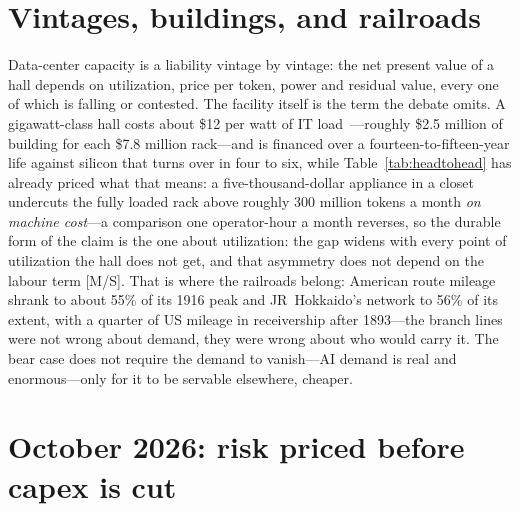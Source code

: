 \section{Vintages, buildings, and railroads}

Data-center capacity is a liability vintage by vintage: the net present value of a hall depends on utilization, price per token, power and residual value, every one of which is falling or contested. The facility itself is the term the debate omits. A gigawatt-class hall costs about \$12 per watt of IT load~\cite{matsuoka-dc-survey}---roughly \$2.5 million of building for each \$7.8 million rack---and is financed over a fourteen-to-fifteen-year life against silicon that turns over in four to six, while Table~\ref{tab:headtohead} has already priced what that means: a five-thousand-dollar appliance in a closet undercuts the fully loaded rack above roughly 300 million tokens a month \emph{on machine cost}---a comparison one operator-hour a month reverses, so the durable form of the claim is the one about utilization: the gap widens with every point of utilization the hall does not get, and that asymmetry does not depend on the labour term [M/S]. That is where the railroads belong: American route mileage shrank to about 55\% of its 1916 peak and JR~Hokkaido's network to 56\% of its extent, with a quarter of US mileage in receivership after 1893---the branch lines were not wrong about demand, they were wrong about who would carry it. The bear case does not require the demand to vanish---AI demand is real and enormous---only for it to be servable elsewhere, cheaper.

\section{October 2026: risk priced before capex is cut}

